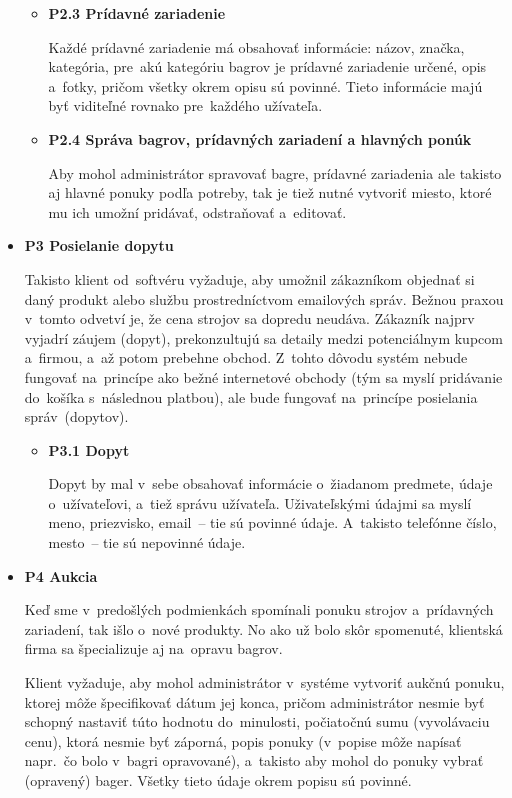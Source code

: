 \begin{itemize}
\begin{itemize}
\item \textbf{P2.3 Prídavné zariadenie}

Každé prídavné zariadenie má obsahovať informácie: názov, značka, kategória, pre~akú kategóriu bagrov je prídavné zariadenie určené, opis a~fotky, pričom všetky okrem opisu sú povinné. Tieto informácie majú byť viditeľné rovnako pre~každého užívateľa.

\item \textbf{P2.4 Správa bagrov, prídavných zariadení a hlavných ponúk}

Aby mohol administrátor spravovať bagre, prídavné zariadenia ale takisto aj hlavné ponuky podľa potreby, tak je tiež nutné vytvoriť miesto, ktoré mu ich umožní pridávať, odstraňovať a~editovať.
\end{itemize}

\item \textbf{P3 Posielanie dopytu}

Takisto klient od~softvéru vyžaduje, aby umožnil zákazníkom objednať si daný produkt alebo službu prostredníctvom emailových správ. Bežnou praxou v~tomto odvetví je, že cena strojov sa dopredu neudáva. Zákazník najprv vyjadrí záujem (dopyt), prekonzultujú sa detaily medzi potenciálnym kupcom a~firmou, a~až potom prebehne obchod. Z~tohto dôvodu systém nebude fungovať na~princípe ako bežné internetové obchody (tým sa myslí pridávanie do~košíka s~následnou platbou), ale bude fungovať na~princípe posielania správ~(dopytov).

\begin{itemize}
\item \textbf{P3.1 Dopyt}

Dopyt by mal v~sebe obsahovať informácie o~žiadanom predmete, údaje o~užívateľovi, a~tiež správu užívateľa. Uživateľskými údajmi sa myslí meno, priezvisko, email~-- tie sú povinné údaje. A~takisto telefónne číslo, mesto~-- tie sú nepovinné údaje.
\end{itemize}

\item \textbf{P4 Aukcia}

Keď sme v~predošlých podmienkách spomínali ponuku strojov a~prídavných zariadení, tak išlo o~nové produkty. No ako už bolo skôr spomenuté, klientská firma sa špecializuje aj na~opravu bagrov.

Klient vyžaduje, aby mohol administrátor v~systéme vytvoriť aukčnú ponuku, ktorej môže špecifikovať dátum jej konca, pričom administrátor nesmie byť schopný nastaviť túto hodnotu do~minulosti, počiatočnú sumu (vyvolávaciu cenu), ktorá nesmie byť záporná, popis ponuky (v~popise môže napísať napr.~čo bolo v~bagri opravované), a~takisto aby mohol do ponuky vybrať (opravený) bager. Všetky tieto údaje okrem popisu sú povinné.


\end{itemize}
